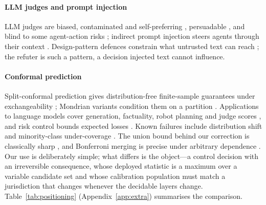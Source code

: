 \paragraph{LLM judges and prompt injection}
LLM judges are biased, contaminated and self-preferring \citep{zheng2023judge,wang2023fair,ye2024justice,chen2024humans,li2025leakage}, persuadable \citep{hwang2025persuasion}, and blind to some agent-action risks \citep{yuan2024rjudge,ruan2024toolemu}; indirect prompt injection steers agents through their context \citep{greshake2023injection,debenedetti2024agentdojo}. Design-pattern defences constrain what untrusted text can reach \citep{beurerkellner2025patterns}; the refuter is such a pattern, a decision injected text cannot influence.

\paragraph{Conformal prediction}
Split-conformal prediction gives distribution-free finite-sample guarantees under exchangeability \citep{vovk2005alrw,lei2018distribution,angelopoulos2023gentle}; Mondrian variants condition them on a partition \citep{vovk2005alrw}. Applications to language models cover generation, factuality, robot planning and judge scores \citep{quach2023clm,mohri2024factuality,ren2023knowno,sheng2025judgeconformal}, and risk control bounds expected losses \citep{angelopoulos2024crc,angelopoulos2021ltt}. Known failures include distribution shift \citep{ulmer2024nonexchangeable,lin2025domainshift} and minority-class under-coverage \citep{tursunbadalov2026minority}. The union bound behind our correction is classically sharp \citep{frechet1935,galambos1996bonferroni}, and Bonferroni merging is precise under arbitrary dependence \citep{vovk2020averaging,vovk2022admissible}. Our use is deliberately simple; what differs is the object---a control decision with an irreversible consequence, whose deployed statistic is a maximum over a variable candidate set and whose calibration population must match a jurisdiction that changes whenever the decidable layers change. Table~\ref{tab:positioning} (Appendix~\ref{app:extra}) summarises the comparison.
